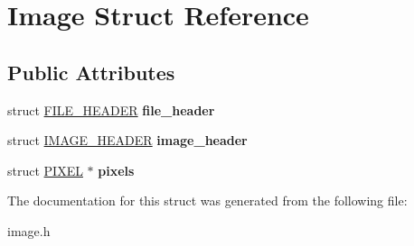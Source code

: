 \hypertarget{structImage}{}\section{Image Struct Reference}
\label{structImage}
\subsection*{Public Attributes}
\begin{DoxyCompactItemize}
\item 
\mbox{\label{structImage_a28cf2c0c1ef6e0ed8db2d5290a5c4ab9}} 
struct \hyperlink{structFILE__HEADER}{F\+I\+L\+E\+\_\+\+H\+E\+A\+D\+ER} {\bfseries file\+\_\+header}
\item 
\mbox{\label{structImage_a8958357b23009ad05e82d28f3e12844b}} 
struct \hyperlink{structIMAGE__HEADER}{I\+M\+A\+G\+E\+\_\+\+H\+E\+A\+D\+ER} {\bfseries image\+\_\+header}
\item 
\mbox{\label{structImage_a3c165d0a7680471b190d64e789230ef8}} 
struct \hyperlink{structPIXEL}{P\+I\+X\+EL} $\ast$ {\bfseries pixels}
\end{DoxyCompactItemize}


The documentation for this struct was generated from the following file\+:\begin{DoxyCompactItemize}
\item 
image.\+h\end{DoxyCompactItemize}
